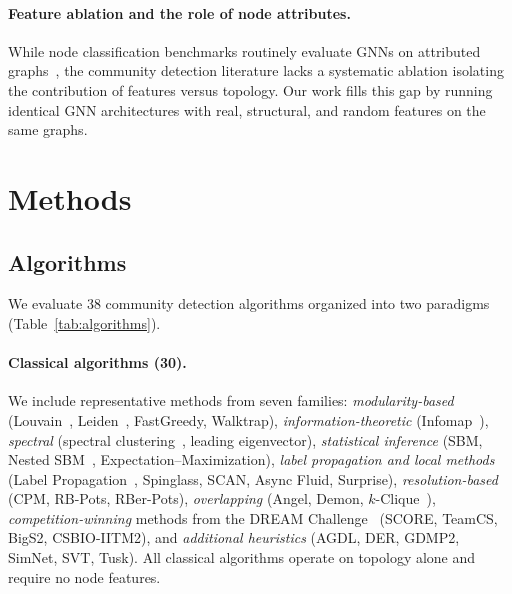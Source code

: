 \documentclass[11pt]{article}
\begin{document}
\paragraph{Feature ablation and the role of node attributes.}
While node classification benchmarks routinely evaluate GNNs on attributed graphs~\citep{sen_cora_2008, shchur_amazon_2018}, the community detection literature lacks a systematic ablation isolating the contribution of features versus topology.
Our work fills this gap by running identical GNN architectures with real, structural, and random features on the same graphs.


\section{Methods}
\label{sec:methods}

\subsection{Algorithms}
\label{sec:algorithms}

We evaluate 38 community detection algorithms organized into two paradigms (Table~\ref{tab:algorithms}).

\paragraph{Classical algorithms (30).}
We include representative methods from seven families:
\emph{modularity-based} (Louvain~\citep{vincent_d__blondel_eead1c1a}, Leiden~\citep{traag_leiden_2019}, FastGreedy, Walktrap),
\emph{information-theoretic} (Infomap~\citep{martin_rosvall_68b9da5e}),
\emph{spectral} (spectral clustering~\citep{ulrike_von_luxburg_b9cd91aa}, leading eigenvector),
\emph{statistical inference} (SBM, Nested SBM~\citep{peixoto_sbm_2014}, Expectation--Maximization),
\emph{label propagation and local methods} (Label Propagation~\citep{santo_fortunato_93a74814}, Spinglass, SCAN, Async Fluid, Surprise),
\emph{resolution-based} (CPM, RB-Pots, RBer-Pots),
\emph{overlapping} (Angel, Demon, $k$-Clique~\citep{gergely_palla_c9fbd5c7}),
\emph{competition-winning} methods from the DREAM Challenge~\citep{choobdar_dream_2019} (SCORE, TeamCS, BigS2, CSBIO-IITM2),
and \emph{additional heuristics} (AGDL, DER, GDMP2, SimNet, SVT, Tusk).
All classical algorithms operate on topology alone and require no node features.
\end{document}
